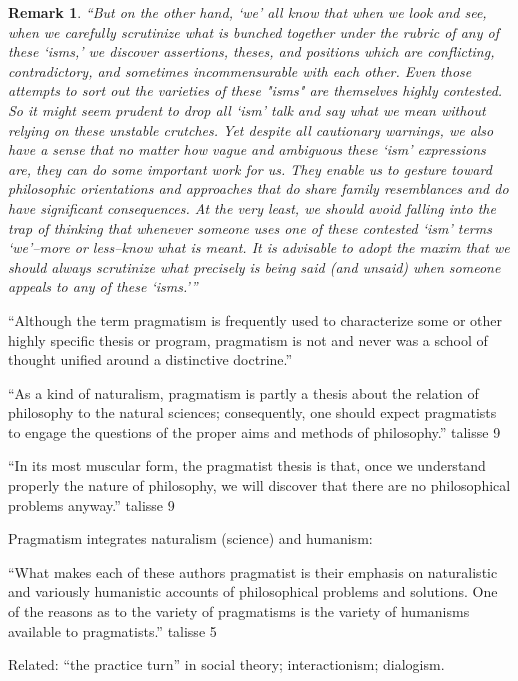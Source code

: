 \documentclass[11pt,twoside]{article}
\newtheorem{remark}{Remark}
\begin{document}
\begin{remark}
  ``But on the other hand, `we' all know that when we look and see, when we carefully scrutinize what is bunched together under the rubric of any of these `isms,' we discover assertions, theses, and positions which are conflicting, contradictory, and sometimes incommensurable with each other.  Even those attempts to sort out the varieties of these "isms" are themselves highly contested. So it might seem prudent to drop all `ism' talk and say what we mean without relying on these unstable crutches.  Yet despite all cautionary warnings, we also have a sense that no matter how vague and ambiguous these `ism' expressions are, they can do some important work for us. They enable us to gesture toward philosophic orientations and approaches that do share family resemblances and do have significant consequences.  At the very least, we should avoid falling into the trap of thinking that whenever someone uses one of these contested `ism' terms `we'--more or less--know what is meant.  It is advisable to adopt the maxim that we should always scrutinize what precisely is being said (and unsaid) when someone appeals to any of these `isms.'''  \parencite[57]{baert_towards_2005}
\end{remark}


``Although the term pragmatism is frequently used to characterize some or other highly specific thesis or program, pragmatism is not and never was a school of thought unified around a distinctive doctrine.'' \parencite[1]{talisse_pragmatism_2011}

``As a kind of naturalism, pragmatism is partly a thesis about the
relation of philosophy to the natural sciences; consequently, one
should expect pragmatists to engage the questions of the proper aims
and methods of philosophy.'' talisse 9

``In its most muscular form, the pragmatist thesis is that, once we understand properly the nature of philosophy, we will discover that there are no philosophical problems anyway.'' talisse 9

Pragmatism integrates naturalism (science) and humanism:

``What makes each of these authors pragmatist is their emphasis on
naturalistic and variously humanistic accounts of philosophical
problems and solutions. One of the reasons as to the variety of
pragmatisms is the variety of humanisms available to pragmatists.''
talisse 5

Related: ``the practice turn'' in social theory; interactionism;
dialogism.
\end{document}
